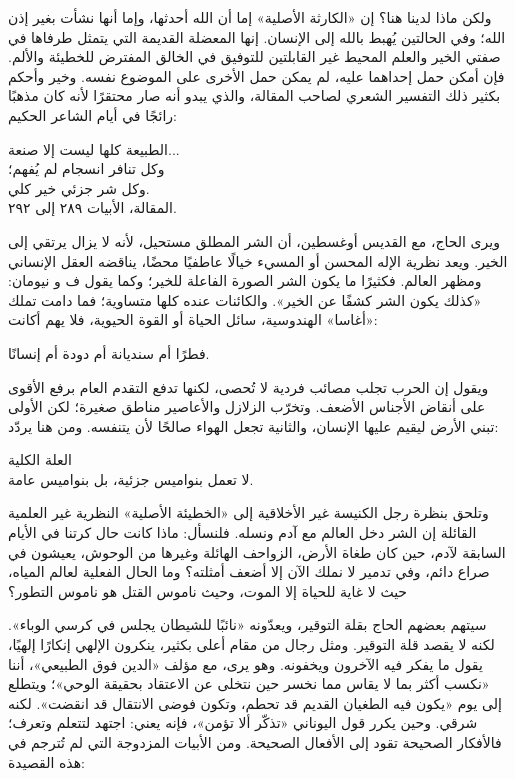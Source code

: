 ولكن ماذا لدينا هنا؟ إن «الكارثة الأصلية» إما أن الله أحدثها، وإما أنها نشأت بغير إذن الله؛ وفي الحالتين يُهبط بالله إلى الإنسان. إنها المعضلة القديمة التي يتمثل طرفاها في صفتي الخير والعلم المحيط غير القابلتين للتوفيق في الخالق المفترض للخطيئة والألم. فإن أمكن حمل إحداهما عليه، لم يمكن حمل الأخرى على الموضوع نفسه. وخير وأحكم بكثير ذلك التفسير الشعري لصاحب المقالة، والذي يبدو أنه صار محتقرًا لأنه كان مذهبًا رائجًا في أيام الشاعر الحكيم:

\begin{SourceQuotation}
الطبيعة كلها ليست إلا صنعة...\\
وكل تنافر انسجام لم يُفهم؛\\
وكل شر جزئي خير كلي.\\
المقالة، الأبيات ٢٨٩ إلى ٢٩٢.
\end{SourceQuotation}

ويرى الحاج، مع القديس أوغسطين، أن الشر المطلق مستحيل، لأنه لا يزال يرتقي إلى الخير. ويعد نظرية الإله المحسن أو المسيء خيالًا عاطفيًا محضًا، يناقضه العقل الإنساني ومظهر العالم. فكثيرًا ما يكون الشر الصورة الفاعلة للخير؛ وكما يقول ف و نيومان: «كذلك يكون الشر كشفًا عن الخير». والكائنات عنده كلها متساوية؛ فما دامت تملك «أغاسا» الهندوسية، سائل الحياة أو القوة الحيوية، فلا يهم أكانت:

\begin{SourceQuotation}
فطرًا أم سنديانة أم دودة أم إنسانًا.
\end{SourceQuotation}

ويقول إن الحرب تجلب مصائب فردية لا تُحصى، لكنها تدفع التقدم العام برفع الأقوى على أنقاض الأجناس الأضعف. وتخرّب الزلازل والأعاصير مناطق صغيرة؛ لكن الأولى تبني الأرض ليقيم عليها الإنسان، والثانية تجعل الهواء صالحًا لأن يتنفسه. ومن هنا يردّد:

\begin{SourceQuotation}
العلة الكلية\\
لا تعمل بنواميس جزئية، بل بنواميس عامة.
\end{SourceQuotation}

وتلحق بنظرة رجل الكنيسة غير الأخلاقية إلى «الخطيئة الأصلية» النظرية غير العلمية القائلة إن الشر دخل العالم مع آدم ونسله. فلنسأل: ماذا كانت حال كرتنا في الأيام السابقة لآدم، حين كان طغاة الأرض، الزواحف الهائلة وغيرها من الوحوش، يعيشون في صراع دائم، وفي تدمير لا نملك الآن إلا أضعف أمثلته؟ وما الحال الفعلية لعالم المياه، حيث لا غاية للحياة إلا الموت، وحيث ناموس القتل هو ناموس التطور؟

سيتهم بعضهم الحاج بقلة التوقير، ويعدّونه «نائبًا للشيطان يجلس في كرسي الوباء». لكنه لا يقصد قلة التوقير. ومثل رجال من مقام أعلى بكثير، ينكرون الإلهي إنكارًا إلهيًا، يقول ما يفكر فيه الآخرون ويخفونه. وهو يرى، مع مؤلف «الدين فوق الطبيعي»، أننا «نكسب أكثر بما لا يقاس مما نخسر حين نتخلى عن الاعتقاد بحقيقة الوحي»؛ ويتطلع إلى يوم «يكون فيه الطغيان القديم قد تحطم، وتكون فوضى الانتقال قد انقضت». لكنه شرقي. وحين يكرر قول اليوناني «تذكّر ألا تؤمن»، فإنه يعني: اجتهد لتتعلم وتعرف؛ فالأفكار الصحيحة تقود إلى الأفعال الصحيحة. ومن الأبيات المزدوجة التي لم تُترجم في هذه القصيدة:


